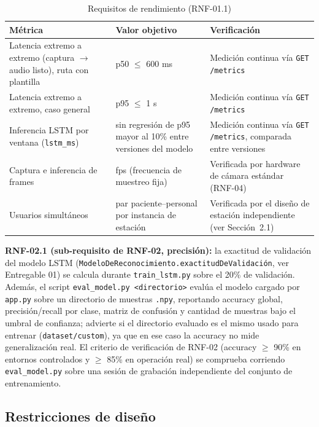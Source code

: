 \begin{table}[H]
    \centering
    \caption{Requisitos de rendimiento (RNF-01.1)}
    \label{tab:rendimiento}
    \small
    \begin{tabularx}{\textwidth}{>{\raggedright\arraybackslash}p{5.2cm} >{\raggedright\arraybackslash}p{3.6cm} X}
        \toprule
        \textbf{Métrica} & \textbf{Valor objetivo} & \textbf{Verificación} \\
        \midrule
        Latencia extremo a extremo (captura $\rightarrow$ audio listo), ruta con plantilla & p50 $\leq$ 600 ms & Medición continua vía \texttt{GET /metrics} \\
        Latencia extremo a extremo, caso general & p95 $\leq$ 1 s & Medición continua vía \texttt{GET /metrics} \\
        Inferencia LSTM por ventana (\texttt{lstm\_ms}) & sin regresión de p95 mayor al 10\% entre versiones del modelo & Medición continua vía \texttt{GET /metrics}, comparada entre versiones \\
        Captura e inferencia de frames & 20 fps (frecuencia de muestreo fija) & Verificada por hardware de cámara estándar (RNF-04) \\
        Usuarios simultáneos & 1 par paciente--personal por instancia de estación & Verificada por el diseño de estación independiente (ver Sección~2.1) \\
        \bottomrule
    \end{tabularx}
\end{table}

\textbf{RNF-02.1 (sub-requisito de RNF-02, precisión):} la
exactitud de validación del modelo LSTM (\texttt{ModeloDeReconocimiento.exactitudDeValidación},
ver Entregable 01) se calcula durante \texttt{train\_lstm.py} sobre el 20\%
de validación. Además, el script \texttt{eval\_model.py <directorio>}
evalúa el modelo cargado por \texttt{app.py} sobre un directorio de
muestras \texttt{.npy}, reportando accuracy global, precisión/recall por
clase, matriz de confusión y cantidad de muestras bajo el umbral de
confianza; advierte si el directorio evaluado es el mismo usado para
entrenar (\texttt{dataset/custom}), ya que en ese caso la accuracy no mide
generalización real. El criterio de verificación de RNF-02 (accuracy
$\geq$ 90\% en entornos controlados y $\geq$ 85\% en operación real) se
comprueba corriendo \texttt{eval\_model.py} sobre una sesión de grabación
independiente del conjunto de entrenamiento.

\subsection{Restricciones de diseño}


